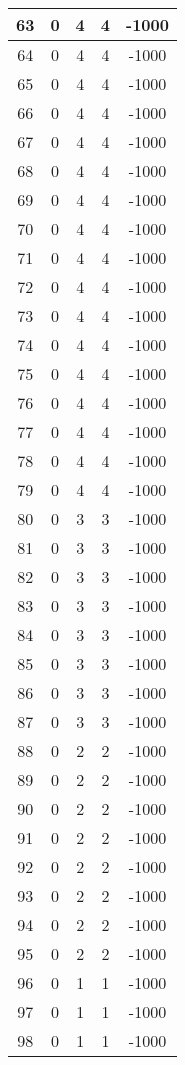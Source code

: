 \documentclass[letterpaper, 12pt]{article}
\begin{document}
\begin{longtable}{|c|c|c|c|c|}
\hline
63 & 0 & 4 & 4 & -1000 \\
\hline
64 & 0 & 4 & 4 & -1000 \\
\hline
65 & 0 & 4 & 4 & -1000 \\
\hline
66 & 0 & 4 & 4 & -1000 \\
\hline
67 & 0 & 4 & 4 & -1000 \\
\hline
68 & 0 & 4 & 4 & -1000 \\
\hline
69 & 0 & 4 & 4 & -1000 \\
\hline
70 & 0 & 4 & 4 & -1000 \\
\hline
71 & 0 & 4 & 4 & -1000 \\
\hline
72 & 0 & 4 & 4 & -1000 \\
\hline
73 & 0 & 4 & 4 & -1000 \\
\hline
74 & 0 & 4 & 4 & -1000 \\
\hline
75 & 0 & 4 & 4 & -1000 \\
\hline
76 & 0 & 4 & 4 & -1000 \\
\hline
77 & 0 & 4 & 4 & -1000 \\
\hline
78 & 0 & 4 & 4 & -1000 \\
\hline
79 & 0 & 4 & 4 & -1000 \\
\hline
80 & 0 & 3 & 3 & -1000 \\
\hline
81 & 0 & 3 & 3 & -1000 \\
\hline
82 & 0 & 3 & 3 & -1000 \\
\hline
83 & 0 & 3 & 3 & -1000 \\
\hline
84 & 0 & 3 & 3 & -1000 \\
\hline
85 & 0 & 3 & 3 & -1000 \\
\hline
86 & 0 & 3 & 3 & -1000 \\
\hline
87 & 0 & 3 & 3 & -1000 \\
\hline
88 & 0 & 2 & 2 & -1000 \\
\hline
89 & 0 & 2 & 2 & -1000 \\
\hline
90 & 0 & 2 & 2 & -1000 \\
\hline
91 & 0 & 2 & 2 & -1000 \\
\hline
92 & 0 & 2 & 2 & -1000 \\
\hline
93 & 0 & 2 & 2 & -1000 \\
\hline
94 & 0 & 2 & 2 & -1000 \\
\hline
95 & 0 & 2 & 2 & -1000 \\
\hline
96 & 0 & 1 & 1 & -1000 \\
\hline
97 & 0 & 1 & 1 & -1000 \\
\hline
98 & 0 & 1 & 1 & -1000 \\

\end{longtable}
\end{document}
